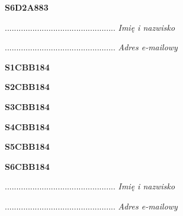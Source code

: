 \begin{turn}{90}\huge \textbf{S6D2A883}\end{turn}

\begin{turn}{90}\begin{minipage}{\linewidth} \vspace{20mm} ................................................  \textit{Imię i nazwisko}\end{minipage}\end{turn}

\begin{turn}{90}\begin{minipage}{\linewidth} \vspace{20mm} ................................................  \textit{Adres e-mailowy}\end{minipage}\end{turn}

\begin{turn}{90}\huge \textbf{S1CBB184}\end{turn}

\begin{turn}{90}\huge \textbf{S2CBB184}\end{turn}

\begin{turn}{90}\huge \textbf{S3CBB184}\end{turn}

\begin{turn}{90}\huge \textbf{S4CBB184}\end{turn}

\begin{turn}{90}\huge \textbf{S5CBB184}\end{turn}

\begin{turn}{90}\huge \textbf{S6CBB184}\end{turn}

\begin{turn}{90}\begin{minipage}{\linewidth} \vspace{20mm} ................................................  \textit{Imię i nazwisko}\end{minipage}\end{turn}

\begin{turn}{90}\begin{minipage}{\linewidth} \vspace{20mm} ................................................  \textit{Adres e-mailowy}\end{minipage}\end{turn}

